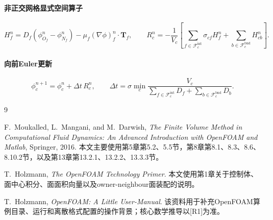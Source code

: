 \documentclass[UTF8,12pt,a4paper]{ctexart}
\numberwithin{equation}{section}
\newcommand{\Rone}{\textnormal{[R1]}}
\newcommand{\Tf}{\bm T}
\begin{document}
\paragraph{非正交网格显式空间算子}
\begin{equation}
  \boxed{
  H_f^n
  =D_f(\phi_{O_f}^n-\phi_{N_f}^n)
  -\mu_f(\nabla\phi)_f^n\cdot\Tf_f,
  \qquad
  R_c^n
  =-\frac{1}{V_c}
  \left[
  \sum_{f\in\mathcal F_c^{\mathrm{int}}}\sigma_{cf}H_f^n
  +
  \sum_{b\in\mathcal F_c^{\mathrm{bnd}}}H_{cb}^n
  \right].}
  \label{eq:summary_space}
\end{equation}

\paragraph{向前Euler更新}
\begin{equation}
  \boxed{
  \phi_c^{n+1}
  =\phi_c^n+\Delta t\,R_c^n,
  \qquad
  \Delta t
  =\sigma\min_c
  \frac{V_c}{
  \displaystyle\sum_{f\in\mathcal F_c^{\mathrm{int}}}D_f
  +\displaystyle\sum_{b\in\mathcal F_c^{\mathrm{bnd}}}D_b}}.
  \label{eq:summary_update}
\end{equation}

\newpage
\begin{thebibliography}{9}

F.~Moukalled, L.~Mangani, and M.~Darwish,
\textit{The Finite Volume Method in Computational Fluid Dynamics: An Advanced Introduction with OpenFOAM and Matlab},
Springer, 2016.
本文主要使用第5章第5.2、5.5节，第8章第8.1、8.3、8.6、8.10.2节，以及第13章第13.2.1、13.2.2、13.3.3节。

T.~Holzmann,
\textit{The OpenFOAM Technology Primer}.
本文使用第1章关于控制体、面中心积分、面面积向量以及owner-neighbour面装配的说明。

T.~Holzmann,
\textit{OpenFOAM: A Little User-Manual}.
该资料用于补充OpenFOAM算例目录、运行和离散格式配置的操作背景；核心数学推导以\Rone 为准。

\end{thebibliography}
\end{document}
